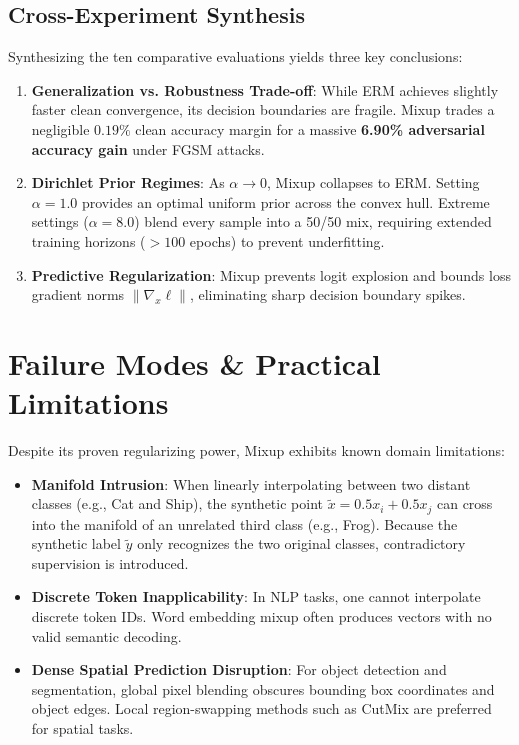\documentclass[conference]{IEEEtran}
\begin{document}
\subsection{Cross-Experiment Synthesis}
Synthesizing the ten comparative evaluations yields three key conclusions:
\begin{enumerate}
    \item \textbf{Generalization vs. Robustness Trade-off}: While ERM achieves slightly faster clean convergence, its decision boundaries are fragile. Mixup trades a negligible $0.19\%$ clean accuracy margin for a massive \textbf{6.90\% adversarial accuracy gain} under FGSM attacks.
    \item \textbf{Dirichlet Prior Regimes}: As $\alpha \to 0$, Mixup collapses to ERM. Setting $\alpha = 1.0$ provides an optimal uniform prior across the convex hull. Extreme settings ($\alpha = 8.0$) blend every sample into a 50/50 mix, requiring extended training horizons ($>100$ epochs) to prevent underfitting.
    \item \textbf{Predictive Regularization}: Mixup prevents logit explosion and bounds loss gradient norms $\|\nabla_x \ell\|$, eliminating sharp decision boundary spikes.
\end{enumerate}

\section{Failure Modes \& Practical Limitations}

Despite its proven regularizing power, Mixup exhibits known domain limitations:
\begin{itemize}
    \item \textbf{Manifold Intrusion}: When linearly interpolating between two distant classes (e.g., Cat and Ship), the synthetic point $\tilde{x} = 0.5 x_i + 0.5 x_j$ can cross into the manifold of an unrelated third class (e.g., Frog). Because the synthetic label $\tilde{y}$ only recognizes the two original classes, contradictory supervision is introduced.
    \item \textbf{Discrete Token Inapplicability}: In NLP tasks, one cannot interpolate discrete token IDs. Word embedding mixup often produces vectors with no valid semantic decoding.
    \item \textbf{Dense Spatial Prediction Disruption}: For object detection and segmentation, global pixel blending obscures bounding box coordinates and object edges. Local region-swapping methods such as CutMix are preferred for spatial tasks.
\end{itemize}
\end{document}
